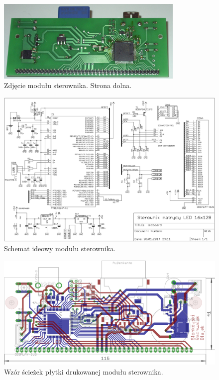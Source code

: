 \begin{figure}[tb]
    \begin{center}
       \includegraphics[width=0.8\textwidth]{figures/zdj-sterownik-down.jpg}
    \end{center}

    \caption{Zdjęcie modułu sterownika. Strona dolna.}
    \label{zdj-sterownik-down}
\end{figure}

\begin{figure}
    \begin{center}
       \includegraphics{figures/schemat.pdf}
    \end{center}

    \caption{Schemat ideowy modułu sterownika.}%
    \label{schemat_sterownika}
\end{figure}

\begin{figure}[t]
    \begin{center}
       \includegraphics[width=\textwidth]{figures/layout.png}
    \end{center}

    \caption{Wzór ścieżek płytki drukowanej modułu sterownika.}%
    \label{layout_sterownika}
\end{figure}

